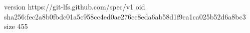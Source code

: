 version https://git-lfs.github.com/spec/v1
oid sha256:fec2a8b0fbdc01a5c958cc4ed0ae276cc8eda6ab58d1f9ca1ca025b52d6a8bc3
size 455
